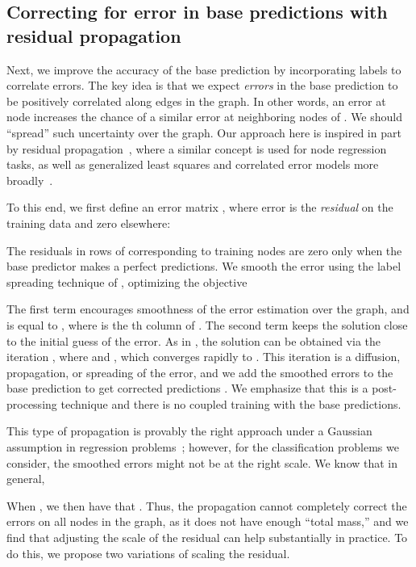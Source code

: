 \documentclass{article}
\begin{document}
\subsection{Correcting for error in base predictions with residual propagation}
Next, we improve the accuracy of the base prediction  by incorporating labels to correlate errors.
The key idea is that we expect \emph{errors} in the base prediction to be positively correlated along edges in the graph.
In other words, an error at node  increases the chance of a similar error at neighboring nodes of .
We should ``spread'' such uncertainty over the graph.
Our approach here is inspired in part by residual propagation~\citep{Jia-2020-GNNR}, 
where a similar concept is used for node regression tasks, 
as well as generalized least squares and correlated error models more broadly~\citep{shalizi2013advanced}.

To this end, we first define an error matrix , 
where error is the \emph{residual} on the training data and zero elsewhere:

The residuals in rows of  corresponding to training nodes are zero only when the base predictor makes a perfect predictions.
We smooth the error using the label spreading technique of \citet{zhou2004learning},
optimizing the objective

The first term encourages smoothness of the error estimation over the graph, and is equal
to , where  is the th column of .
The second term keeps the solution close to the initial guess  of the error. As in \citet{zhou2004learning}, 
the solution can be obtained via the iteration ,
where  and , which converges rapidly to .
This iteration is a diffusion, propagation, or spreading of the error,
and we add the smoothed errors to the base prediction to get corrected predictions .
We emphasize that this is a post-processing technique and there is no coupled training with the base predictions.

This type of propagation is provably the right approach under a Gaussian assumption in regression problems~\citep{Jia-2020-GNNR};
however, for the classification problems we consider, the smoothed errors  might not be at the right scale. 
We know that in general,

When , we then have that .
Thus, the propagation cannot completely correct the errors on all nodes in the graph, as it does not have enough ``total mass,''
and we find that adjusting the scale of the residual can help substantially in practice.
To do this, we propose two variations of scaling the residual.
\end{document}
